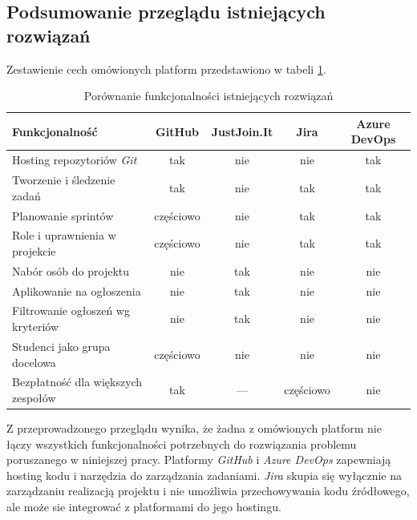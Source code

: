 \subsection{Podsumowanie przeglądu istniejących rozwiązań}
\label{sec:podsumowanie-przegladu}
Zestawienie cech omówionych platform przedstawiono w tabeli \ref{tab:porownanie-rozwiazan}.
\begin{table}[htb]
    \centering
    \caption{Porównanie funkcjonalności istniejących rozwiązań}
    \label{tab:porownanie-rozwiazan}
    \small
    \begin{tabularx}{\linewidth}{@{}X c c c c @{}}
        \toprule
        Funkcjonalność & GitHub & JustJoin.It & Jira & Azure DevOps \\
        \midrule
        Hosting repozytoriów \emph{Git}            & tak       & nie & nie       & tak       \\ \hline
        Tworzenie i śledzenie zadań               & tak       & nie & tak       & tak       \\ \hline
        Planowanie sprintów                        & częściowo & nie & tak       & tak       \\ \hline
        Role i uprawnienia w projekcie             & częściowo & nie & tak       & tak       \\ \hline
        Nabór osób do projektu                      & nie       & tak & nie       & nie       \\ \hline
        Aplikowanie na ogłoszenia                  & nie       & tak & nie       & nie       \\ \hline
        Filtrowanie ogłoszeń wg kryteriów          & nie       & tak & nie       & nie       \\ \hline
        Studenci jako grupa docelowa               & częściowo & nie & nie       & nie       \\ \hline
        Bezpłatność dla większych zespołów         & tak       & ---  & częściowo & nie      \\
        \bottomrule
    \end{tabularx}
\end{table}
Z przeprowadzonego przeglądu wynika, że żadna z omówionych platform nie łączy wszystkich funkcjonalności potrzebnych do rozwiązania problemu poruszanego w niniejszej pracy.
Platformy \emph{GitHub} i \emph{Azure DevOps} zapewniają hosting kodu i narzędzia do zarządzania zadaniami.
\emph{Jira} skupia się wyłącznie na zarządzaniu realizacją projektu i nie umożliwia przechowywania kodu źródłowego, ale może sie integrować z platformami do jego hostingu.
